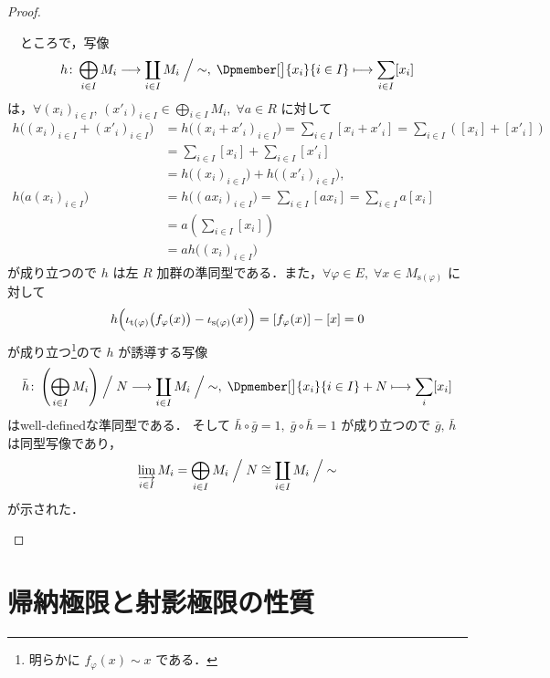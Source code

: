 \documentclass[algtopo_main]{subfiles}
\begin{document}
\begin{proof}
\begin{enumerate}
\begin{description}
			　ところで，写像
			\begin{align}
				h \colon \bigoplus_{i \in I} M_i \lto \coprod_{i \in I} M_i \Bigm/ {\sim},\; \Dpmember[\big]{x_i}{i \in I} \lmto \sum_{i \in I} [x_i]
			\end{align}
			は，$\forall (x_i)_{i\in I},\,  (x'_i)_{i \in I} \in \bigoplus_{i \in I} M_i,\;  \forall a \in R$ に対して
			\begin{align}
				h \bigl( (x_i)_{i\in I} + (x'_i)_{i \in I} \bigr) &= h \bigl( (x_i +  x'_i)_{i \in I} \bigr) = \sum_{i \in I} [x_i + x'_i]
				= \sum_{i \in I} ([x_i] + [x'_i]) \\
				&= \sum_{i \in I} [x_i] + \sum_{i \in I} [x'_i] \\
				&= h \bigl( (x_i)_{i\in I} \bigr) + h\bigl( (x'_i)_{i \in I} \bigr), \\
				h \bigl( a (x_i)_{i\in I} \bigr) &= h \bigl( (ax_i)_{i \in I} \bigr) = \sum_{i \in I} [ax_i]
				= \sum_{i \in I} a[x_i] \\
				&= a \left( \sum_{i \in I} [x_i] \right) \\
				&= a h \bigl( (x_i)_{i\in I} \bigr)
			\end{align}
			が成り立つので $h$ は左 $R$ 加群の準同型である．また，$\forall \varphi \in E,\;\forall x \in M_{\mathrm{s}(\varphi)}$ に対して
			\begin{align}
				h \Bigl( \iota_{\mathrm{t}(\varphi)} \bigl( f_\varphi (x) \bigr) - \iota_{\mathrm{s}(\varphi)} (x) \Bigr) = [f_\varphi(x)] - [x] = 0
			\end{align}
			が成り立つ\footnote{明らかに $f_{\varphi}(x) \sim x$ である．}ので $h$ が誘導する写像
			\begin{align}
				\bar{h} \colon \left(\bigoplus_{i \in I} M_i \right) \Bigm/ N \lto \coprod_{i \in I} M_i \Bigm/ {\sim},\; \Dpmember[\big]{x_i}{i \in I} + N \lmto \sum_i [x_i]
			\end{align}
			はwell-definedな準同型である．
			そして $\bar{h} \circ \bar{g} = 1,\; \bar{g} \circ \bar{h} = 1$ が成り立つので $\bar{g},\, \bar{h}$ は同型写像であり，
			\begin{align}
				\varinjlim_{i \in I} M_i  = \bigoplus_{i \in I} M_i \Bigm/ N \cong \coprod_{i \in I} M_i \Bigm/ {\sim}
			\end{align}
			が示された．
		\end{description}
	\end{enumerate}
\end{proof}



\section{帰納極限と射影極限の性質}
\end{document}
